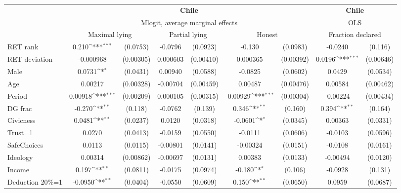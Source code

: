 \def\sym#1{\ifmmode^{#1}\else\(^{#1}\)\fi}
\begin{tabular}{l|cccccc|cc}
\hline\hline
&\multicolumn{6}{c|}{\bf Chile}&\multicolumn{2}{c}{\bf Chile}\\ &\multicolumn{6}{c|}{Mlogit, average marginal effects }&\multicolumn{2}{c}{OLS}\\
                &\multicolumn{2}{c}{Maximal lying}&\multicolumn{2}{c}{Partial lying}&\multicolumn{2}{c}{Honest}  &\multicolumn{2}{c}{Fraction declared}\\
\hline
RET rank        &    0.210\sym{***}& (0.0753)&  -0.0796         & (0.0923)&   -0.130         & (0.0983)&  -0.0240         &  (0.116)\\
RET deviation   &-0.000968         &(0.00305)& 0.000603         &(0.00410)& 0.000365         &(0.00392)&   0.0196\sym{***}&(0.00646)\\
Male            &   0.0731\sym{*}  & (0.0431)&  0.00940         & (0.0588)&  -0.0825         & (0.0602)&   0.0429         & (0.0534)\\
Age             &  0.00217         &(0.00328)& -0.00704         &(0.00459)&  0.00487         &(0.00476)&  0.00584         &(0.00462)\\
Period          &  0.00918\sym{***}&(0.00209)& 0.000105         &(0.00315)& -0.00929\sym{***}&(0.00304)& -0.00224         &(0.00434)\\
DG frac         &   -0.270\sym{**} &  (0.118)&  -0.0762         &  (0.139)&    0.346\sym{**} &  (0.160)&    0.394\sym{**} &  (0.164)\\
Civicness       &   0.0481\sym{**} & (0.0237)&   0.0120         & (0.0318)&  -0.0601\sym{*}  & (0.0345)&  0.00363         & (0.0331)\\
Trust=1         &   0.0270         & (0.0413)&  -0.0159         & (0.0550)&  -0.0111         & (0.0606)&  -0.0103         & (0.0596)\\
SafeChoices     &   0.0113         & (0.0115)& -0.00801         & (0.0141)& -0.00324         & (0.0151)&  -0.0108         & (0.0161)\\
Ideology        &  0.00314         &(0.00862)& -0.00697         & (0.0131)&  0.00383         & (0.0133)& -0.00494         & (0.0120)\\
Income          &    0.197\sym{**} & (0.0811)&  -0.0175         & (0.0974)&   -0.180\sym{*}  &  (0.106)&  -0.0928         &  (0.131)\\
Deduction 20\%=1&  -0.0950\sym{**} & (0.0404)&  -0.0550         & (0.0609)&    0.150\sym{**} & (0.0650)&   0.0959         & (0.0687)\\

\end{tabular}
